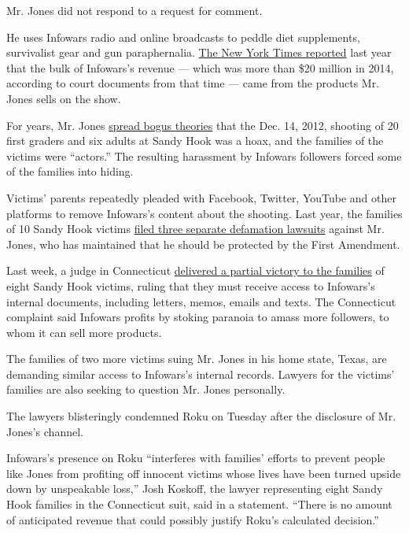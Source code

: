 Mr. Jones did not respond to a request for comment.

He uses Infowars radio and online broadcasts to peddle diet supplements,
survivalist gear and gun paraphernalia.
\href{https://www.nytimes3xbfgragh.onion/2018/09/07/us/politics/alex-jones-business-infowars-conspiracy.html?module=inline}{The
New York Times reported} last year that the bulk of Infowars's revenue
--- which was more than \$20 million in 2014, according to court
documents from that time --- came from the products Mr. Jones sells on
the show.

For years, Mr. Jones
\href{https://www.nytimes3xbfgragh.onion/2018/05/23/us/politics/alex-jones-trump-sandy-hook.html}{spread
bogus theories} that the Dec. 14, 2012, shooting of 20 first graders and
six adults at Sandy Hook was a hoax, and the families of the victims
were ``actors.'' The resulting harassment by Infowars followers forced
some of the families into hiding.

Victims' parents repeatedly pleaded with Facebook, Twitter, YouTube and
other platforms to remove Infowars's content about the shooting. Last
year, the families of 10 Sandy Hook victims
\href{https://www.nytimes3xbfgragh.onion/2018/07/31/us/politics/alex-jones-defamation-suit-sandy-hook.html}{filed
three separate defamation lawsuits} against Mr. Jones, who has
maintained that he should be protected by the First Amendment.

Last week, a judge in Connecticut
\href{https://www.nytimes3xbfgragh.onion/2019/01/12/us/alex-jones-infowars-lawsuit.html}{delivered
a partial victory to the families} of eight Sandy Hook victims, ruling
that they must receive access to Infowars's internal documents,
including letters, memos, emails and texts. The Connecticut complaint
said Infowars profits by stoking paranoia to amass more followers, to
whom it can sell more products.

The families of two more victims suing Mr. Jones in his home state,
Texas, are demanding similar access to Infowars's internal records.
Lawyers for the victims' families are also seeking to question Mr. Jones
personally.

The lawyers blisteringly condemned Roku on Tuesday after the disclosure
of Mr. Jones's channel.

Infowars's presence on Roku ``interferes with families' efforts to
prevent people like Jones from profiting off innocent victims whose
lives have been turned upside down by unspeakable loss,'' Josh Koskoff,
the lawyer representing eight Sandy Hook families in the Connecticut
suit, said in a statement. ``There is no amount of anticipated revenue
that could possibly justify Roku's calculated decision.''

